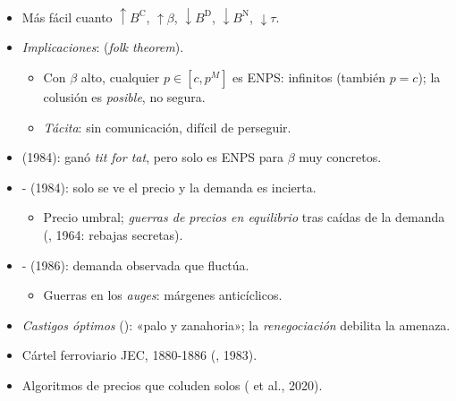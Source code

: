 \documentclass{article}
\begin{document}
\begin{columnas}
\begin{itemize}
\begin{itemize}
  \item Más fácil cuanto $\uparrow B^{\mathrm C}$, $\uparrow\beta$, $\downarrow B^{\mathrm D}$, $\downarrow B^{\mathrm N}$, $\downarrow\tau$.
  \end{itemize}
\end{itemize}
\begin{itemize}
\item \emph{Implicaciones}:  (\emph{folk theorem}).
  \begin{itemize}
  \item Con $\beta$ alto, cualquier $p\in[c,p^M]$ es ENPS: infinitos (también $p=c$); la colusión es \emph{posible}, no segura.
  \item \emph{Tácita}: sin comunicación, difícil de perseguir.
  \end{itemize}
\item {} (1984): ganó \emph{tit for tat}, pero solo es ENPS para $\beta$ muy concretos.
\end{itemize}
\begin{itemize}
\item {}- (1984): solo se ve el precio y la demanda es incierta.
  \begin{itemize}
  \item Precio umbral; \emph{guerras de precios en equilibrio} tras caídas de la demanda (, 1964: rebajas secretas).
  \end{itemize}
\item {}- (1986): demanda observada que fluctúa.
  \begin{itemize}
  \item Guerras en los \emph{auges}: márgenes anticíclicos.
  \end{itemize}
\item \emph{Castigos óptimos} (): «palo y zanahoria»; la \emph{renegociación} debilita la amenaza.
\end{itemize}
\begin{itemize}
\item Cártel ferroviario JEC, 1880-1886 (, 1983).
\item Algoritmos de precios que coluden solos ( et al., 2020).
\end{itemize}

\end{columnas}
\end{document}
